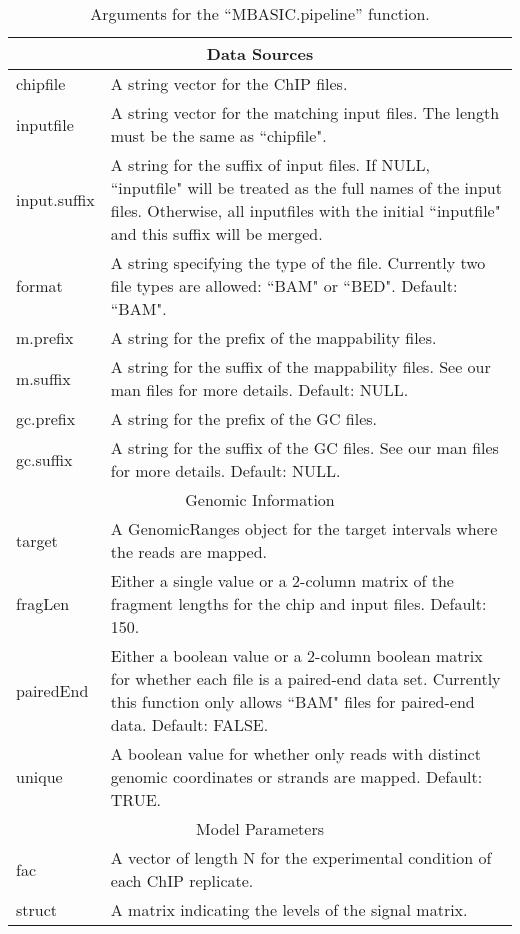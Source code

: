 \documentclass[a4paper,10pt]{article}
\begin{document}
\begin{table}
  \centering
  \caption{Arguments for the ``MBASIC.pipeline'' function.}\label{tbl:arguments}
  \begin{tabular}{p{2cm}p{10cm}}
    \hline
    \multicolumn{2}{c}{Data Sources}\\
    \hline
    chipfile & A string vector for the ChIP files.\\
    inputfile & A string vector for the matching input files. The length must be the same as ``chipfile".\\
    input.suffix & A string for the suffix of input files. If NULL, ``inputfile" will be treated as the full names of the input files. Otherwise, all inputfiles with the initial ``inputfile" and this suffix will be merged.\\
    format & A string specifying the type of the file.  Currently two file types are allowed: ``BAM" or ``BED".  Default: ``BAM".\\
    m.prefix & A string for the prefix of the mappability files.\\
    m.suffix & A string for the suffix of the mappability files. See our man files for more details.  Default: NULL.\\
    gc.prefix & A string for the prefix of the GC files.\\
    gc.suffix & A string for the suffix of the GC files.  See our man files for more details. Default: NULL.\\
    \hline
    \multicolumn{2}{c}{Genomic Information}\\
    \hline
    target & A GenomicRanges object for the target intervals where the reads are mapped.\\
    fragLen & Either a single value or a 2-column matrix of the fragment lengths for the chip and input files.  Default: 150.\\
    pairedEnd & Either a boolean value or a 2-column boolean matrix for  whether each file is a paired-end data set. Currently this function only allows ``BAM" files for paired-end data. Default: FALSE.\\
    unique & A boolean value for whether only reads with distinct genomic coordinates or strands are mapped.  Default: TRUE.\\
    \hline
    \multicolumn{2}{c}{Model Parameters}\\
    \hline
    fac & A vector of length N for the experimental condition of each ChIP replicate.\\
    struct & A matrix indicating the levels of the signal matrix. \\

\end{tabular}
\end{table}
\end{document}
